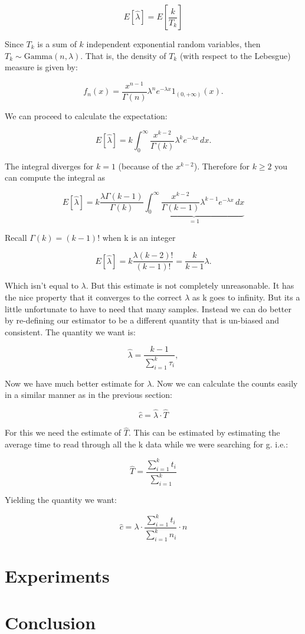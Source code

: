 \documentclass[a4paper]{article}
\begin{document}
$$E[\hat{\lambda}] = E[ \frac{k}{ T_k } ]$$

Since $T_k$ is a sum of $k$ independent exponential random variables, then $T_k\sim\mathrm{Gamma}(n,\lambda)$. That is, the density of $T_k$ (with respect to the Lebesgue) measure is given by:

$$
f_n(x)=\frac{x^{n-1}}{\Gamma(n)}\lambda^ne^{-\lambda x} 1_{(0,+\infty)}(x).
$$

We can proceed to calculate the expectation:

$$
 E\left[\hat\lambda\right]=k\int_0^\infty\frac{x^{k-2}}{\Gamma(k)}\lambda^ke^{-\lambda x}\, dx.
$$

The integral diverges for $k=1$ (because of the $x^{k-2}$).
Therefore for $k\ge2$  you can compute the integral as

$$
 E\left[\hat\lambda \right]=k\frac{\lambda\Gamma(k-1)}{\Gamma(k)}\underbrace{\int_0^\infty\frac{x^{k-2}}{\Gamma(k-1)}\lambda^{k-1}e^{-\lambda x}\, dx}_{=1}
$$

Recall $\Gamma{(k)} = (k-1)!$ when k is an integer

$$
E[\hat{\lambda}] =  k\frac{\lambda (k-2)! }{(k-1)!}= \frac k{k-1}\lambda.
$$

Which isn't equal to $\lambda$. 
But this estimate is not completely unreasonable.
It has the nice property that it converges to the correct $\lambda$ as k goes to infinity.
But its a little unfortunate to have to need that many samples.
Instead we can do better by re-defining our estimator to be a different quantity that is un-biased and consistent.
The quantity we want is:

$$
\hat\lambda =\frac{k-1}{\sum_{i=1}^k\tau_i},
$$


Now we have much better estimate for $\lambda$.
Now we can calculate the counts easily in a similar manner as in the previous section:

$$\hat{c} = \hat{\lambda} \cdot \hat{T} $$

For this we need the estimate of $\hat{T}$.
This can be estimated by estimating the average time to read through all the k data while we were searching for g. i.e.:

$$\hat{T} = \frac{ \sum^{k}_{i=1} t_i }{ \sum^{k}_{i=1} }$$

Yielding the quantity we want:

$$\hat{c}  = \lambda \cdot \frac{\sum^{k}_{i=1} t_i}{\sum^{k}_{i=1} n_i} \cdot n $$


\section{Experiments}


\section{Conclusion}
\end{document}
